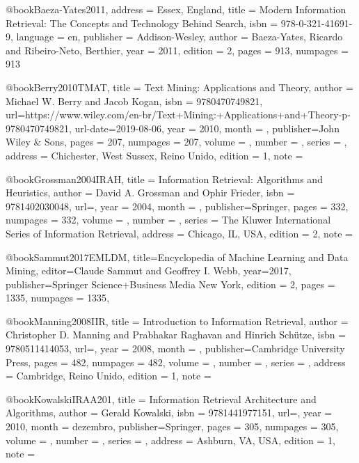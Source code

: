 @book{Baeza-Yates2011,
	address = {Essex, England},
	title = {Modern {Information} {Retrieval}: The Concepts and Technology Behind Search},
	isbn = {978-0-321-41691-9},
	language = {en},
	publisher = {Addison-Wesley},
	author = {Baeza-Yates, Ricardo and Ribeiro-Neto, Berthier},
	year = {2011},
	edition  = {2},
    pages = {913},
    numpages = {913}
}

@book{Berry2010TMAT,
    title = {Text Mining: Applications and Theory},
    author = {Michael W. Berry and Jacob Kogan},
    isbn = {9780470749821},
    url={https://www.wiley.com/en-br/Text+Mining:+Applications+and+Theory-p-9780470749821},
    url-date={2019-08-06},
    year = {2010},
    month = {},
    publisher={John Wiley \& Sons},
    pages = {207},
    numpages = {207},
    volume   = {},
    number   = {},
    series   = {},
    address  = {Chichester, West Sussex, Reino Unido},
    edition  = {1},
    note     = {}
}

@book{Grossman2004IRAH,
    title = {Information Retrieval: Algorithms and Heuristics},
    author = {David A. Grossman and Ophir Frieder},
    isbn = {9781402030048},
    url={},
    year = {2004},
    month = {},
    publisher={Springer},
    pages = {332},
    numpages = {332},
    volume   = {},
    number   = {},
    series   = {The Kluwer International Series of Information Retrieval},
    address  = {Chicago, IL, USA},
    edition  = {2},
    note     = {}
}

@book{Sammut2017EMLDM,
    title={Encyclopedia of Machine Learning and Data Mining},
    editor={Claude Sammut and Geoffrey I. Webb},
    year={2017},
    publisher={Springer Science+Business Media New York},
    edition  = {2},
    pages = {1335},
    numpages = {1335},
}

@book{Manning2008IIR,
    title = {Introduction to Information Retrieval},
    author = {Christopher D. Manning and Prabhakar Raghavan and Hinrich Schütze},
    isbn = {9780511414053},
    url={},
    year = {2008},
    month = {},
    publisher={Cambridge University Press},
    pages = {482},
    numpages = {482},
    volume   = {},
    number   = {},
    series   = {},
    address  = {Cambridge, Reino Unido},
    edition  = {1},
    note     = {}
}

@book{KowalskiIRAA201,
    title = {Information Retrieval Architecture and Algorithms},
    author = {Gerald Kowalski},
    isbn = {9781441977151},
    url={},
    year = {2010},
    month = {dezembro},
    publisher={Springer},
    pages = {305},
    numpages = {305},
    volume   = {},
    number   = {},
    series   = {},
    address  = {Ashburn, VA, USA},
    edition  = {1},
    note     = {}
}

